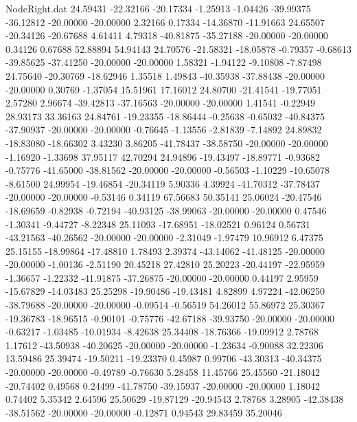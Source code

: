 \begin{filecontents}{NodeRight.dat}
  24.59431  -22.32166  -20.17334    -1.25913   -1.04426  -39.99375  -36.12812  -20.00000  -20.00000    2.32166    0.17334  -14.36870  -11.91663
  24.65507  -20.34126  -20.67688     4.61411    4.79318  -40.81875  -35.27188  -20.00000  -20.00000    0.34126    0.67688   52.88894   54.94143
  24.70576  -21.58321  -18.05878    -0.79357   -0.68613  -39.85625  -37.41250  -20.00000  -20.00000    1.58321   -1.94122   -9.10808   -7.87498
  24.75640  -20.30769  -18.62946     1.35518    1.49843  -40.35938  -37.88438  -20.00000  -20.00000    0.30769   -1.37054   15.51961   17.16012
  24.80700  -21.41541  -19.77051     2.57280    2.96674  -39.42813  -37.16563  -20.00000  -20.00000    1.41541   -0.22949   28.93173   33.36163
  24.84761  -19.23355  -18.86444    -0.25638   -0.65032  -40.84375  -37.90937  -20.00000  -20.00000   -0.76645   -1.13556   -2.81839   -7.14892
  24.89832  -18.83080  -18.66302     3.43230    3.86205  -41.78437  -38.58750  -20.00000  -20.00000   -1.16920   -1.33698   37.95117   42.70294
  24.94896  -19.43497  -18.89771    -0.93682   -0.75776  -41.65000  -38.81562  -20.00000  -20.00000   -0.56503   -1.10229  -10.65078   -8.61500
  24.99954  -19.46854  -20.34119     5.90336    4.39924  -41.70312  -37.78437  -20.00000  -20.00000   -0.53146    0.34119   67.56683   50.35141
  25.06024  -20.47546  -18.69659    -0.82938   -0.72194  -40.93125  -38.99063  -20.00000  -20.00000    0.47546   -1.30341   -9.44727   -8.22348
  25.11093  -17.68951  -18.02521     0.96124    0.56731  -43.21563  -40.26562  -20.00000  -20.00000   -2.31049   -1.97479   10.96912    6.47375
  25.15155  -18.99864  -17.48810     1.78493    2.39374  -43.14062  -41.48125  -20.00000  -20.00000   -1.00136   -2.51190   20.45218   27.42810
  25.20223  -20.44197  -22.95959    -1.36657   -1.22332  -41.91875  -37.26875  -20.00000  -20.00000    0.44197    2.95959  -15.67829  -14.03483
  25.25298  -19.90486  -19.43481     4.82899    4.97224  -42.06250  -38.79688  -20.00000  -20.00000   -0.09514   -0.56519   54.26012   55.86972
  25.30367  -19.36783  -18.96515    -0.90101   -0.75776  -42.67188  -39.93750  -20.00000  -20.00000   -0.63217   -1.03485  -10.01934   -8.42638
  25.34408  -18.76366  -19.09912     2.78768    1.17612  -43.50938  -40.20625  -20.00000  -20.00000   -1.23634   -0.90088   32.22306   13.59486
  25.39474  -19.50211  -19.23370     0.45987    0.99706  -43.30313  -40.34375  -20.00000  -20.00000   -0.49789   -0.76630    5.28458   11.45766
  25.45560  -21.18042  -20.74402     0.49568    0.24499  -41.78750  -39.15937  -20.00000  -20.00000    1.18042    0.74402    5.35342    2.64596
  25.50629  -19.87129  -20.94543     2.78768    3.28905  -42.38438  -38.51562  -20.00000  -20.00000   -0.12871    0.94543   29.83459   35.20046

\end{filecontents}
